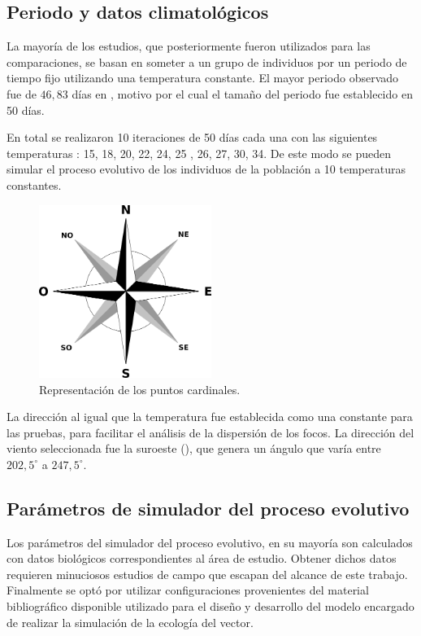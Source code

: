 \subsection{Periodo y datos climatológicos}
La mayoría de los estudios, que posteriormente fueron utilizados para las comparaciones, se basan
en someter a un grupo de individuos por un periodo de tiempo fijo utilizando una temperatura
constante. El mayor periodo observado fue de $46,83$ días en \cite{rueda1990temperature}, motivo
por el cual el tamaño del periodo fue establecido en 50 días.

En total se realizaron 10 iteraciones de 50 días cada una con las siguientes temperaturas :
15\textcelsius , 18\textcelsius , 20\textcelsius , 22\textcelsius , 24\textcelsius , 25\textcelsius
, 26\textcelsius , 27\textcelsius , 30\textcelsius , 34\textcelsius. De este modo se pueden simular
el proceso evolutivo de los individuos de la población a 10 temperaturas constantes.

\begin{figure}[!htpb]
\centering
\includegraphics[width=0.5\textwidth]{./capitulo-6/graphics/rosa-de-vientos.png}
\caption{\label{fig:puntos-cardinales}Representación de los puntos cardinales.}
\end{figure}

La dirección al igual que la temperatura fue establecida como una constante para las pruebas, para
facilitar el análisis de la dispersión de los focos. La dirección del viento seleccionada fue la
suroeste (), que genera un ángulo que varía entre $202,5^{\circ}$ a
$247,5^{\circ}$.

\subsection{Parámetros de simulador del proceso evolutivo}
Los parámetros del simulador del proceso evolutivo, en su mayoría son calculados con datos
biológicos correspondientes al área de estudio. Obtener dichos datos requieren minuciosos estudios
de campo que escapan del alcance de este trabajo. Finalmente se optó por utilizar configuraciones
provenientes del material bibliográfico disponible utilizado para el diseño y desarrollo del
modelo encargado de realizar la simulación de la ecología del vector.

